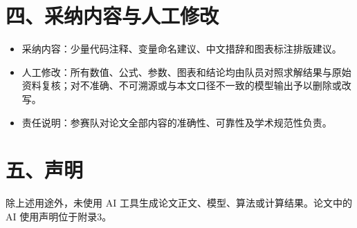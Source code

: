 \documentclass[12pt,a4paper]{ctexart}
\begin{document}
\section*{四、采纳内容与人工修改}
\begin{itemize}
  \item 采纳内容：少量代码注释、变量命名建议、中文措辞和图表标注排版建议。
  \item 人工修改：所有数值、公式、参数、图表和结论均由队员对照求解结果与原始资料复核；对不准确、不可溯源或与本文口径不一致的模型输出予以删除或改写。
  \item 责任说明：参赛队对论文全部内容的准确性、可靠性及学术规范性负责。
\end{itemize}

\section*{五、声明}
除上述用途外，未使用 AI 工具生成论文正文、模型、算法或计算结果。论文中的 AI 使用声明位于附录3。
\end{document}
